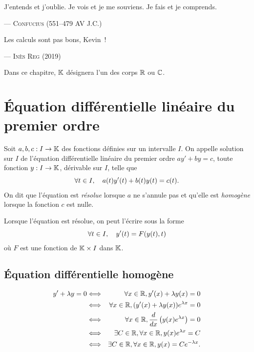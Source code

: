 \documentclass{magnoliaold}
\begin{document}
\setlength{}
\epigraph{\og J'entends et j'oublie. Je vois et je me souviens. Je fais et je comprends.\fg}{--- \textsc{Confucius (551--479 AV J.C.)}}
\setlength{}
\epigraph{\og Les calculs sont pas bons, Kevin~!\fg}{--- \textsc{Inès Reg (2019)}}

\magtoc

\vspace{2ex}
Dans ce chapitre, $\mathbb{K}$ désignera l'un des corps $\mathbb{R}$ ou $\mathbb{C}$.

\section{Équation différentielle linéaire du premier ordre}

\begin{definition}
Soit $a,b,c:I\to\mathbb{K}$ des fonctions définies sur un intervalle $I$. On appelle
solution sur $I$ de l'équation différentielle linéaire du premier ordre $a y'+b y=c$, toute
fonction $y:I\to\mathbb{K}$, dérivable sur $I$, telle que
\[\forall t\in I,\quad a(t)y'(t)+b(t)y(t)=c(t).\]
On dit que l'équation est \emph{résolue} lorsque $a$ ne s'annule pas et qu'elle est
\emph{homogène} lorsque la fonction $c$ est nulle.
\end{definition}

\begin{remarqueUnique}
\remarque Lorsque l'équation est résolue, on peut l'écrire sous la forme
  \[\forall t\in I,\quad y'(t)=F(y(t),t)\]
  où $F$ est une fonction de $\mathbb{K}\times I$ dans $\mathbb{K}$.
\end{remarqueUnique}

\subsection{Équation différentielle homogène}


\begin{sol}
\begin{victor}
\begin{eqnarray*}
y'+\lambda y=0 &\Longleftrightarrow& \forall x \in \mathbb{R}, y'(x)+\lambda y(x)=0 \\
&\Longleftrightarrow& \forall x \in \mathbb{R}, (y'(x)+\lambda y(x))e^{\lambda x}=0 \\
&\Longleftrightarrow& \forall x \in \mathbb{R}, \frac{d}{dx}\left(y(x)e^{\lambda x}\right)=0 \\
&\Longleftrightarrow& \exists C\in \mathbb{R}, \forall x \in \mathbb{R}, y(x)e^{\lambda x}=C \\
&\Longleftrightarrow& \exists C\in \mathbb{R}, \forall x \in \mathbb{R}, y(x)=Ce^{-\lambda x}.
\end{eqnarray*}
\end{victor}
\end{sol}
\end{document}
